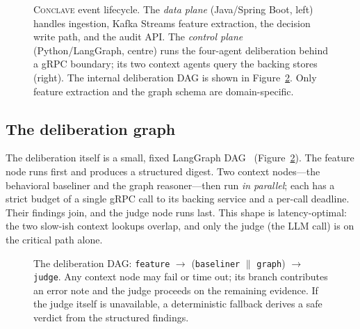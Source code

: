 \documentclass[sigconf,nonacm,screen]{acmart}
\begin{document}
\begin{figure}[t]
\caption{\textsc{Conclave} event lifecycle. The \emph{data plane} (Java/Spring
Boot, left) handles ingestion, Kafka Streams feature extraction, the decision
write path, and the audit API. The \emph{control plane} (Python/LangGraph, centre)
runs the four-agent deliberation behind a gRPC boundary; its two context agents
query the backing stores (right). The internal deliberation DAG is shown in
Figure~\ref{fig:delib}. Only feature extraction and the graph schema are
domain-specific.}
\label{fig:arch}
\end{figure}

\subsection{The deliberation graph}

The deliberation itself is a small, fixed LangGraph DAG~\cite{langgraph2024}
(Figure~\ref{fig:delib}). The feature node runs first and produces a structured
digest. Two context nodes---the behavioral baseliner and the graph
reasoner---then run \emph{in parallel}; each has a strict budget of a single
gRPC call to its backing service and a per-call deadline. Their findings join,
and the judge node runs last. This shape is latency-optimal: the two slow-ish
context lookups overlap, and only the judge (the LLM call) is on the critical
path alone.

\begin{figure}[t]
\centering
{}
\caption{The deliberation DAG: \texttt{feature} $\rightarrow$ (\texttt{baseliner}
$\parallel$ \texttt{graph}) $\rightarrow$ \texttt{judge}. Any context node may
fail or time out; its branch contributes an error note and the judge proceeds on
the remaining evidence. If the judge itself is unavailable, a deterministic
fallback derives a safe verdict from the structured findings.}
\label{fig:delib}
\end{figure}
\end{document}
